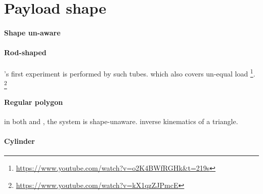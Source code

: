 \documentclass{article}
\begin{document}
	\section{Payload shape}
		\paragraph{Shape un-aware}
			\cite{tagliabue-2017-robust-collaborative-object-transportation-using-multiple-mavs}
			\cite{mellinger-2010-cooperative-grasping-and-transport-using-multiple-quadrotors}
		\paragraph{Rod-shaped}
			\cite{tagliabue-2017-collaborative-transportation-using-mavs-via-passive-force-control}
			\cite{tagliabue-2017-robust-collaborative-object-transportation-using-multiple-mavs}'s first experiment is performed by such tubes.
			\cite{gassner-2017-dynamic-collaboration-without-communication-vision-based-cable-suspended-load-transport-with-two-quadrotors}
			\cite{bandala-2018-payload-lift-and-transport-using-decentralized-unmanned-aerial-vehicle-quadcopter-teams}
			\cite{wu-2020-cooperative-transportation-of-drones-without-inter-agent-communication}
			\cite{mohiuddin-2020-energy-distribution-in-dual-uav-collaborative-transportation-through-load-sharing} which also covers un-equal load \footnote{\url{https://www.youtube.com/watch?v=o2K4BWfRGHk&t=219s}}.
			\cite{spurny-2019-cooperative-transport-of-large-objects-by-a-pair-of-unmanned-aerial-systems-using-sampling-based-motion-planning}
			\cite{lee-2018-an-integrated-framework-for-cooperative-aerial-manipulators-in-unknown-environments}\footnote{\url{https://www.youtube.com/watch?v=kX1qzZJPmcE}}
		\paragraph{Regular polygon}
			in both \cite{tagliabue-2017-collaborative-transportation-using-mavs-via-passive-force-control}
			and \cite{tagliabue-2017-robust-collaborative-object-transportation-using-multiple-mavs}, the system is shape-unaware. 
			\cite{jiang-2013-the-inverse-kinematics-of-cooperative-transport-with-multiple-aerial-robots} inverse kinematics of a triangle.
			\cite{sreenath-2013-dynamics-control-and-planning-for-cooperative-manipulation-of-payloads-suspended-by-cables-from-multiple-quadrotor-robots}
		\paragraph{Cylinder}
			\cite{mohammadi-2018-decentralized-motion-control-in-a-cabled-based-multi-drone-load-transport-system}
\end{document}
